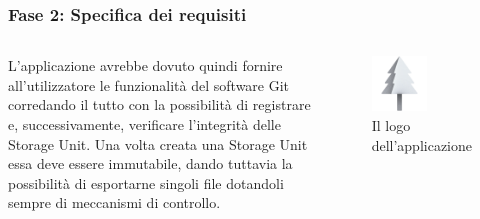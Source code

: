\documentclass{beamer}
\begin{document}
\begin{frame}
	\frametitle{Fase 2: Specifica dei requisiti}
	\begin{columns}
		L'applicazione avrebbe dovuto quindi fornire all'utilizzatore le funzionalità del software Git corredando il tutto con la possibilità di registrare e, successivamente, verificare l'integrità delle Storage Unit. Una volta creata una Storage Unit essa deve essere immutabile, dando tuttavia la possibilità di esportarne singoli file dotandoli sempre di meccanismi di controllo.
		\begin{figure}
			\includegraphics[width=0.55\textwidth]{figures/favicon.png}
			\caption{Il logo dell'applicazione}
		\end{figure}
	\end{columns}
\end{frame}
\end{document}
